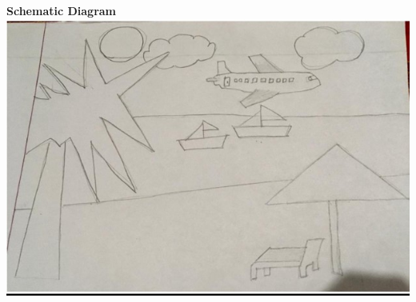 \documentclass{article}
\begin{document}
\begin{center}
    \textbf{Schematic Diagram}
  \includegraphics[]{schematic.jpg}\\
  \\
\end{center}
\\
\begin{center}
    \\
\end{center}
\begin{center}
    \\
\end{center}
\\
\end{document}
